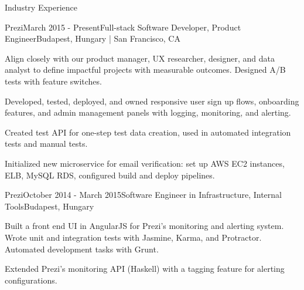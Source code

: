 \documentclass{resume} %
\begin{document}
\begin{rSection}{Industry Experience}

\begin{rSubsection}{Prezi}{March 2015 - Present}{Full-stack Software Developer, Product Engineer}{Budapest, Hungary | San Francisco, CA}
\item Align closely with our product manager, UX researcher, designer, and data analyst to define impactful projects with measurable outcomes. Designed A/B tests with feature switches.
\item Developed, tested, deployed, and owned responsive user sign up flows, onboarding features, and admin management panels with logging, monitoring, and alerting.


\item Created test API for one-step test data creation, used in automated integration tests and manual tests.
\item Initialized new microservice for email verification: set up AWS EC2 instances, ELB, MySQL RDS, configured build and deploy pipelines.

\end{rSubsection}


\begin{rSubsection}{Prezi}{October 2014 - March 2015}{Software Engineer in Infrastructure, Internal Tools}{Budapest, Hungary}
\item Built a front end UI in AngularJS for Prezi's monitoring and alerting system. Wrote unit and integration tests with Jasmine, Karma, and Protractor. Automated development tasks with Grunt.
\item Extended Prezi's monitoring API (Haskell) with a tagging feature for alerting configurations.
\end{rSubsection}


\end{rSection}
\end{document}
